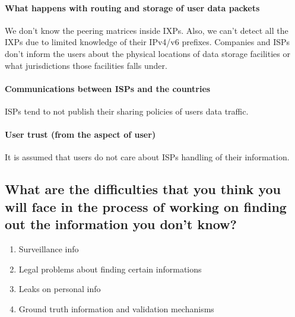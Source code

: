 \paragraph{What happens with routing and storage of user data packets}
We don't know the peering matrices inside IXPs. Also, we can't detect all the 
IXPs due to limited knowledge of their IPv4/v6 prefixes.
Companies and ISPs don't inform the users about the physical locations of data 
storage facilities or what jurisdictions those facilities falls under.

\paragraph{Communications between ISPs and the countries}
ISPs tend to not publish their sharing policies of users data traffic.

\paragraph{User trust (from the aspect of user)}
It is assumed that users do not care about ISPs handling of their information.

\subsection{What are the difficulties that you think you will face in the 
process of working on finding out the information you don't know?}

\begin{enumerate}
\item Surveillance info
\item Legal problems about finding certain informations
\item Leaks on personal info
\item Ground truth information and validation mechanisms
\end{enumerate}
